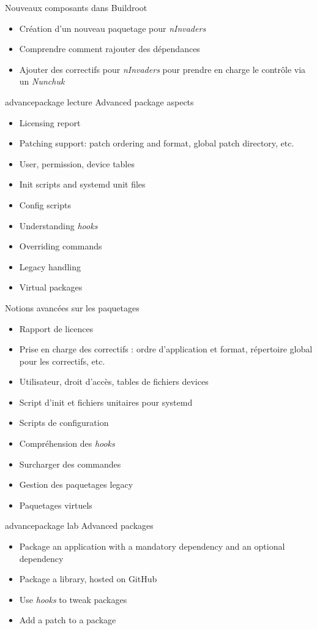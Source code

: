 {Nouveaux composants dans Buildroot}
{
  \begin{itemize}
  \item Création d'un nouveau paquetage pour {\em nInvaders}
  \item Comprendre comment rajouter des dépendances
  \item Ajouter des correctifs pour {\em nInvaders} pour prendre en
	charge le contrôle via un {\em Nunchuk}
  \end{itemize}
}
{advancepackage}
{lecture}
{Advanced package aspects}
{
  \begin{itemize}
  \item Licensing report
  \item Patching support: patch ordering and format, global patch directory, etc.
  \item User, permission, device tables
  \item Init scripts and systemd unit files
  \item Config scripts
  \item Understanding {\em hooks}
  \item Overriding commands
  \item Legacy handling
  \item Virtual packages
  \end{itemize}
}
{Notions avancées sur les paquetages}
{
  \begin{itemize}
  \item Rapport de licences
  \item Prise en charge des correctifs : ordre d'application et format,
	répertoire global pour les correctifs, etc.
  \item Utilisateur, droit d'accès, tables de fichiers devices
  \item Script d'init et fichiers unitaires pour systemd
  \item Scripts de configuration
  \item Compréhension des {\em hooks}
  \item Surcharger des commandes
  \item Gestion des paquetages legacy
  \item Paquetages virtuels
  \end{itemize}
}
{advancepackage}
{lab}
{Advanced packages}
{
  \begin{itemize}
  \item Package an application with a mandatory dependency and an
    optional dependency
  \item Package a library, hosted on GitHub
  \item Use {\em hooks} to tweak packages
  \item Add a patch to a package
  \end{itemize}
}
